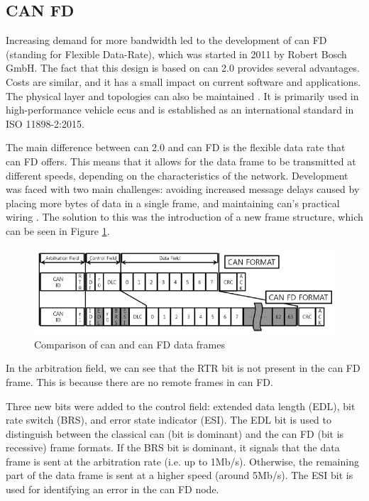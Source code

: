 \subsection{CAN FD}

Increasing demand for more bandwidth led to the development of \gls{can} FD (standing for Flexible Data-Rate), which was started in 2011 by Robert Bosch GmbH. The fact that this design is based on \gls{can} 2.0 provides several advantages. Costs are similar, and it has a small impact on current software and applications. The physical layer and topologies can also be maintained \citep{Woo2016}. It is primarily used in high-performance vehicle \glspl{ecu} and is established as an international standard in ISO 11898-2:2015.\par

The main difference between \gls{can} 2.0 and \gls{can} FD is the flexible data rate that \gls{can} FD offers. This means that it allows for the data frame to be transmitted at different speeds, depending on the characteristics of the network. Development was faced with two main challenges: avoiding increased message delays caused by placing more bytes of data in a single frame, and maintaining \gls{can}'s practical wiring \citep{CANFD}. The solution to this was the introduction of a new frame structure, which can be seen in Figure \ref{fig:CANFD_Frame}.

\begin{figure}
    \centering
    \includegraphics[width = \textwidth]{img/parts/introduction/CAN FD.png}
    \caption{Comparison of \gls{can} and \gls{can} FD data frames \citep{Woo2016}}
    \label{fig:CANFD_Frame}
\end{figure}

In the arbitration field, we can see that the RTR bit is not present in the \gls{can} FD frame. This is because there are no remote frames in \gls{can} FD.\par

Three new bits were added to the control field: extended data length (EDL), bit rate switch (BRS), and error state indicator (ESI). The EDL bit is used to distinguish between the classical \gls{can} (bit is dominant) and the \gls{can} FD (bit is recessive) frame formats. If the BRS bit is dominant, it signals that the data frame is sent at the arbitration rate (i.e. up to 1Mb/s). Otherwise, the remaining part of the data frame is sent at a higher speed (around 5Mb/s). The ESI bit is used for identifying an error in the \gls{can} FD node.\par

